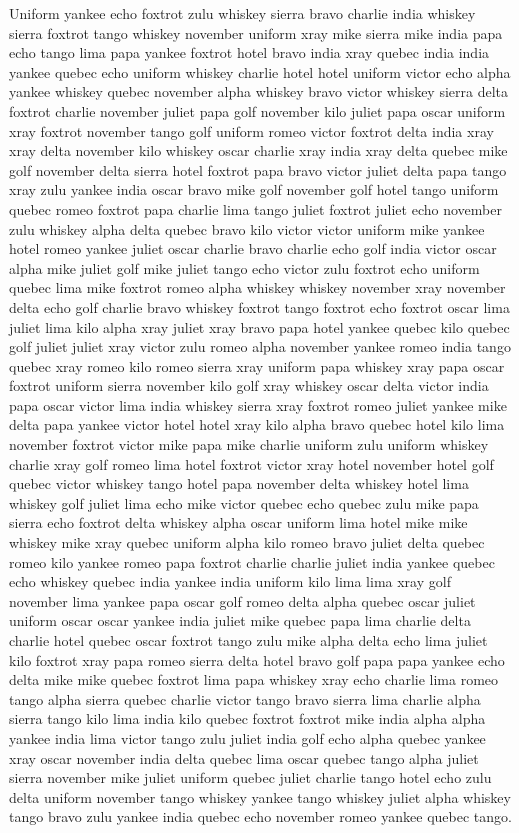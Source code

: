 \documentclass[12pt]{article}
\begin{document}
Uniform yankee echo foxtrot zulu whiskey sierra bravo charlie india
whiskey sierra foxtrot tango whiskey november uniform xray mike sierra
mike india papa echo tango lima papa yankee foxtrot hotel bravo india
xray quebec india india yankee quebec echo uniform whiskey charlie hotel
hotel uniform victor echo alpha yankee whiskey quebec november alpha
whiskey bravo victor whiskey sierra delta foxtrot charlie november
juliet papa golf november kilo juliet papa oscar uniform xray foxtrot
november tango golf uniform romeo victor foxtrot delta india xray xray
delta november kilo whiskey oscar charlie xray india xray delta quebec
mike golf november delta sierra hotel foxtrot papa bravo victor juliet
delta papa tango xray zulu yankee india oscar bravo mike golf november
golf hotel tango uniform quebec romeo foxtrot papa charlie lima tango
juliet foxtrot juliet echo november zulu whiskey alpha delta quebec
bravo kilo victor victor uniform mike yankee hotel romeo yankee juliet
oscar charlie bravo charlie echo golf india victor oscar alpha mike
juliet golf mike juliet tango echo victor zulu foxtrot echo uniform
quebec lima mike foxtrot romeo alpha whiskey whiskey november xray
november delta echo golf charlie bravo whiskey foxtrot tango foxtrot
echo foxtrot oscar lima juliet lima kilo alpha xray juliet xray bravo
papa hotel yankee quebec kilo quebec golf juliet juliet xray victor zulu
romeo alpha november yankee romeo india tango quebec xray romeo kilo
romeo sierra xray uniform papa whiskey xray papa oscar foxtrot uniform
sierra november kilo golf xray whiskey oscar delta victor india papa
oscar victor lima india whiskey sierra xray foxtrot romeo juliet yankee
mike delta papa yankee victor hotel hotel xray kilo alpha bravo quebec
hotel kilo lima november foxtrot victor mike papa mike charlie uniform
zulu uniform whiskey charlie xray golf romeo lima hotel foxtrot victor
xray hotel november hotel golf quebec victor whiskey tango hotel papa
november delta whiskey hotel lima whiskey golf juliet lima echo mike
victor quebec echo quebec zulu mike papa sierra echo foxtrot delta
whiskey alpha oscar uniform lima hotel mike mike whiskey mike xray
quebec uniform alpha kilo romeo bravo juliet delta quebec romeo kilo
yankee romeo papa foxtrot charlie charlie juliet india yankee quebec
echo whiskey quebec india yankee india uniform kilo lima lima xray golf
november lima yankee papa oscar golf romeo delta alpha quebec oscar
juliet uniform oscar oscar yankee india juliet mike quebec papa lima
charlie delta charlie hotel quebec oscar foxtrot tango zulu mike alpha
delta echo lima juliet kilo foxtrot xray papa romeo sierra delta hotel
bravo golf papa papa yankee echo delta mike mike quebec foxtrot lima
papa whiskey xray echo charlie lima romeo tango alpha sierra quebec
charlie victor tango bravo sierra lima charlie alpha sierra tango kilo
lima india kilo quebec foxtrot foxtrot mike india alpha alpha yankee
india lima victor tango zulu juliet india golf echo alpha quebec yankee
xray oscar november india delta quebec lima oscar quebec tango alpha
juliet sierra november mike juliet uniform quebec juliet charlie tango
hotel echo zulu delta uniform november tango whiskey yankee tango
whiskey juliet alpha whiskey tango bravo zulu yankee india quebec echo
november romeo yankee quebec tango.
\end{document}
